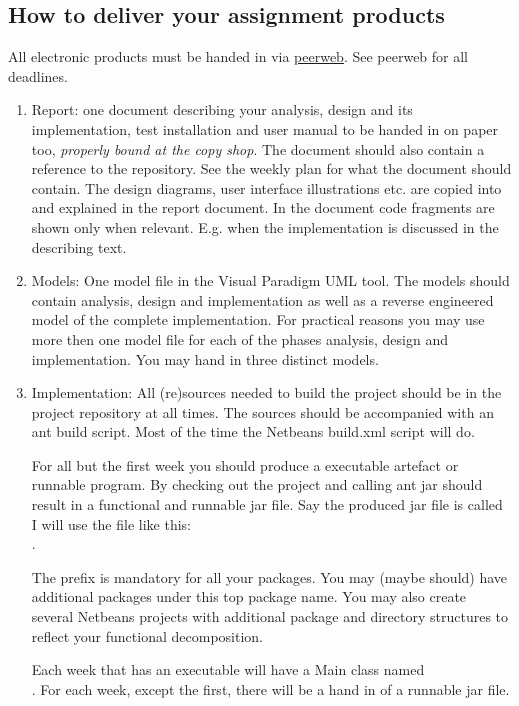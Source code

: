 \subsection{How to deliver your assignment products}
All electronic products must be handed in via \href{https://peerweb.fontysvenlo.org/}{peerweb}. See peerweb for all deadlines.
\begin{enumerate}
\item Report: one document describing your analysis, design and its
  implementation, test installation and user manual to be handed in on
  paper too, \emph{properly bound at the copy shop}. The document should also
  contain a reference to the repository. 
  See the weekly plan for what the document should contain. The
  design diagrams, user interface illustrations etc. are copied into
  and explained in the report document. In the document code fragments
  are shown only when relevant. E.g.  when the implementation is
  discussed in the describing text.
\item  Models: One model file in the Visual Paradigm UML tool.
  The models should contain analysis, design and implementation as
  well as a reverse engineered model of the complete
  implementation. For practical reasons you may use more then one
  model file for each of the phases analysis, design and
  implementation. You may hand in three distinct models.
\item Implementation: All (re)sources needed to build the project
  should be in the project repository at all times. The sources should
  be accompanied with an ant build script. Most of the time the
  Netbeans build.xml script will do.
  
  For all but the first week you should produce a executable artefact
  or runnable program. 
  By checking out the project and calling ant jar should result in a
  functional and runnable jar file. Say the produced jar file is
  called 
  I will use the file like this:\\
  .
  
  The prefix  is mandatory for all your
  packages. You may (maybe should) have additional packages under this
  top package name. You may also create several Netbeans projects with
  additional package and directory structures to reflect your
  functional decomposition.
  
  Each week that has an executable will have a Main class named\\
  . For each
  week, except the first, there will be a hand in of a runnable jar file.
\end{enumerate}

